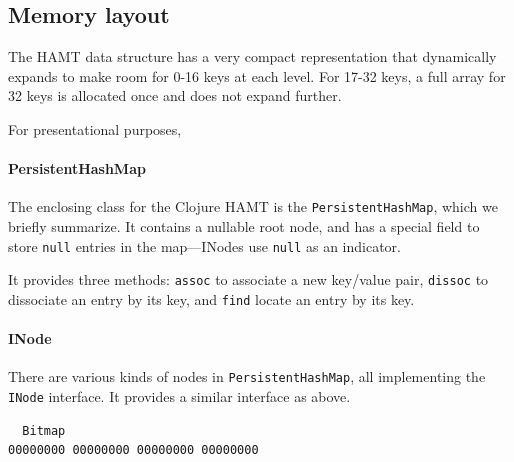 \documentclass[preprint]{sigplanconf}
\begin{document}
\subsection{Memory layout}

The HAMT data structure has a very compact representation
that dynamically expands to make room for 0-16 keys
at each level. For 17-32 keys, a full array for 32 keys
is allocated once and does not expand further.

For presentational purposes, 

\paragraph{PersistentHashMap}

The enclosing class for the Clojure HAMT
is the \texttt{PersistentHashMap},
which we briefly summarize.
It contains a nullable root node,
and has a special field to store
\texttt{null} entries in the map---INodes
use \texttt{null} as an indicator.

It provides three methods: 
\texttt{assoc} to associate a new key/value pair, 
\texttt{dissoc} to dissociate an entry by its key, 
and \texttt{find} locate an entry by its key.



\paragraph{INode}

There are various kinds of nodes in \texttt{PersistentHashMap},
all implementing the \texttt{INode} interface.
It provides a similar interface as above.

\begin{verbatim}
  Bitmap
00000000 00000000 00000000 00000000
\end{verbatim}
\end{document}
